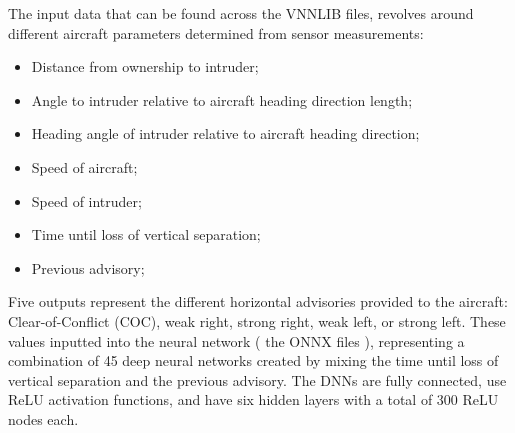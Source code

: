 The input data that can be found across the VNNLIB files, revolves around different aircraft parameters determined from sensor measurements\cite{kochenderfer2011robust}:
\begin{itemize}
  \item Distance from ownership to intruder;
  \item Angle to intruder relative to aircraft heading direction length;
  \item Heading angle of intruder relative to aircraft heading direction;
  \item Speed of aircraft;
  \item Speed of intruder;
  \item Time until loss of vertical separation;
  \item Previous advisory;
\end{itemize}

Five outputs represent the different horizontal advisories provided to the aircraft: Clear-of-Conflict (COC), weak right, strong right, weak left, or strong left.
These values inputted into the neural network ( the ONNX files ), representing a combination of 45 deep neural networks created by mixing the time until loss of vertical separation and the previous advisory. The DNNs are fully connected, use ReLU activation functions, and have six hidden layers with a total of 300 ReLU nodes each. \cite{katz2017reluplex}

